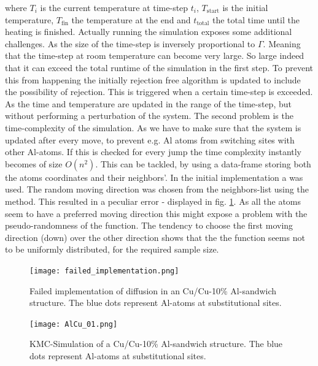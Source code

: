 where \(T_{i}\) is the current temperature at time-step \(t_{i}\), \( T_{\mathrm{start}}\) is the initial temperature, \(T_{\mathrm{fin}}\) the temperature at the end and \(t_{\mathrm{total}}\) the total time until the heating is finished. 
Actually running the simulation exposes some additional challenges. As the size of the time-step is inversely proportional to \(\Gamma\). Meaning that the time-step at room temperature can become very large. So large indeed that it can exceed the total runtime of the simulation in the first step. To prevent this from happening the initially rejection free algorithm is updated to include the possibility of rejection. This is triggered when a certain time-step is exceeded. As the time and temperature are updated in the range of the time-step, but without performing a perturbation of the system. The second problem is the time-complexity of the simulation.  As we have to make sure that the system is updated after every move, to prevent e.g. Al atoms from switching sites with other Al-atoms. If this is checked for every jump the time complexity instantly becomes of size \(O(n^{2})\). This can be tackled, by using a data-frame storing both the atoms coordinates and their neighbors'. In the initial implementation a  was used. The random moving direction was chosen from the neighbors-list using the  method. This resulted in a peculiar error - displayed in fig. \ref{fig:failed_implementation}. As all the  atoms seem to have a preferred moving direction this might expose a problem with the pseudo-randomness of the  function. The tendency to choose the first moving direction (down) over the other direction shows that the the function seems not to be uniformly distributed, for the required sample size.

\begin{figure}[htb]
	\centering
	\texttt{[image: failed\_implementation.png]}\label{fig:failed_implementation}
	\caption{Failed implementation of diffusion in an Cu/Cu-10\% Al-sandwich structure. The blue dots represent Al-atoms at substitutional sites. }
\end{figure}

\begin{figure}[htb]
	\centering
	\texttt{[image: AlCu\_01.png]}\label{fig:Al_Cu_sandwich_time}
	\caption{KMC-Simulation of a Cu/Cu-10\% Al-sandwich structure. The blue dots represent Al-atoms at substitutional sites. }
\end{figure}

